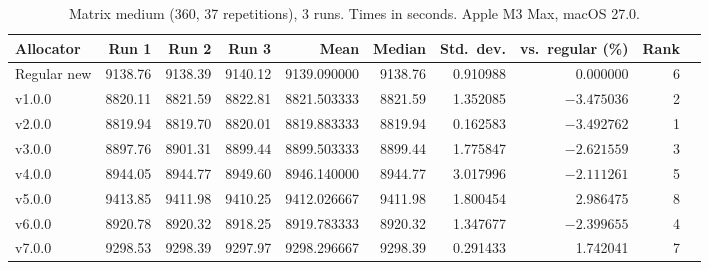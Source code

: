 \begin{table}[H]
\centering
\caption{Matrix medium (360, 37 repetitions), 3 runs. Times in seconds. Apple M3 Max, macOS 27.0.}
\label{tab:matrix-medium}
\footnotesize
\setlength{\tabcolsep}{4pt}
\begin{tabular}{@{}l rrr rrr rr r@{}}
\toprule
Allocator & Run 1 & Run 2 & Run 3 & Mean & Median & Std.\ dev. & vs.\ regular (\%) & Rank \\
\midrule
Regular new & 9138.76 & 9138.39 & 9140.12 & 9139.090000 & 9138.76 & 0.910988 & 0.000000 & 6 \\
v1.0.0 & 8820.11 & 8821.59 & 8822.81 & 8821.503333 & 8821.59 & 1.352085 & $-3.475036$ & 2 \\
v2.0.0 & 8819.94 & 8819.70 & 8820.01 & 8819.883333 & 8819.94 & 0.162583 & $-3.492762$ & 1 \\
v3.0.0 & 8897.76 & 8901.31 & 8899.44 & 8899.503333 & 8899.44 & 1.775847 & $-2.621559$ & 3 \\
v4.0.0 & 8944.05 & 8944.77 & 8949.60 & 8946.140000 & 8944.77 & 3.017996 & $-2.111261$ & 5 \\
v5.0.0 & 9413.85 & 9411.98 & 9410.25 & 9412.026667 & 9411.98 & 1.800454 & 2.986475 & 8 \\
v6.0.0 & 8920.78 & 8920.32 & 8918.25 & 8919.783333 & 8920.32 & 1.347677 & $-2.399655$ & 4 \\
v7.0.0 & 9298.53 & 9298.39 & 9297.97 & 9298.296667 & 9298.39 & 0.291433 & 1.742041 & 7 \\
\bottomrule
\end{tabular}
\end{table}

